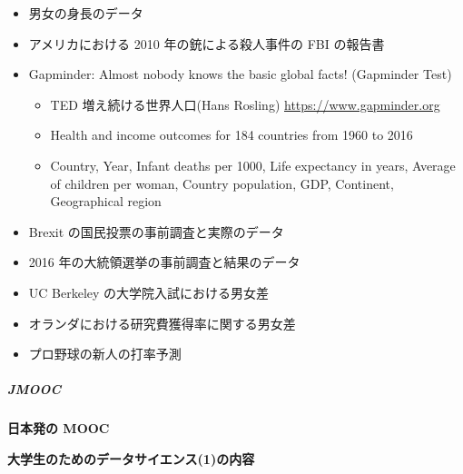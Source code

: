 \documentclass[
]{bxjsbook}
\providecommand{\tightlist}{%
  \setlength{\itemsep}{0pt}\setlength{\parskip}{0pt}}
\theoremstyle{definition}
\theoremstyle{definition}
\theoremstyle{definition}
\theoremstyle{definition}
\theoremstyle{remark}
\begin{document}
\begin{itemize}
\tightlist
\item
  男女の身長のデータ
\item
  アメリカにおける 2010 年の銃による殺人事件の FBI の報告書
\item
  Gapminder: Almost nobody knows the basic global facts! (Gapminder Test)

  \begin{itemize}
  \tightlist
  \item
    TED 増え続ける世界人口(Hans Rosling) \url{https://www.gapminder.org}
  \item
    Health and income outcomes for 184 countries from 1960 to 2016
  \item
    Country, Year, Infant deaths per 1000, Life expectancy in years, Average of children per woman,
    Country population, GDP, Continent, Geographical region
  \end{itemize}
\item
  Brexit の国民投票の事前調査と実際のデータ
\item
  2016 年の大統領選挙の事前調査と結果のデータ
\item
  UC Berkeley の大学院入試における男女差
\item
  オランダにおける研究費獲得率に関する男女差
\item
  プロ野球の新人の打率予測
\end{itemize}

\hypertarget{jmooc}{%
\subparagraph{JMOOC}\label{jmooc}}

\textbf{日本発の MOOC}

\textbf{大学生のためのデータサイエンス(1)の内容}
\end{document}
